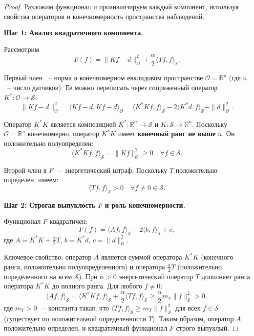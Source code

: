 \documentclass[a4paper,14pt,oneside,openany]{extarticle}
\begin{document}
\begin{proof}
Разложим функционал и проанализируем каждый компонент, используя свойства операторов и 
конечномерность пространства наблюдений.

\textbf{Шаг 1: Анализ квадратичного компонента.}

Рассмотрим
\begin{equation}
    F(f)=\|K f - d\|_{\mathcal{O}}^2 + \frac{\alpha}{2}\langle T f, f\rangle_{\mathcal{S}}.
\end{equation}

Первый член ~-- норма в конечномерном евклидовом пространстве $\mathcal{O} = \mathbb{R}^n$
(где $n$ ~-- число датчиков). 
Ее можно переписать через сопряженный оператор $K^*:\mathcal{O}\to\mathcal{S}$:
\begin{equation}
    \|Kf-d\|_{\mathcal{O}}^2 = \langle Kf-d, Kf-d\rangle_{\mathcal{O}} = 
    \langle K^*Kf, f\rangle_{\mathcal{S}} - 2\langle K^*d, f\rangle_{\mathcal{S}} + \|d\|_{\mathcal{O}}^2.
\end{equation}

Оператор $K^*K$ является композицией $K^*:\mathbb{R}^n\to\mathcal{S}$ и 
$K:\mathcal{S}\to\mathbb{R}^n$. Поскольку $\mathcal{O}=\mathbb{R}^n$
конечномерно, оператор $K^*K$ имеет \textbf{конечный ранг не выше} $n$. 
Он положительно полуопределен:
\begin{equation}
    \langle K^*K f, f\rangle_{\mathcal{S}} = \|Kf\|_{\mathcal{O}}^2 \geq 0 \quad \forall f \in \mathcal{S}.
\end{equation}

Второй член в $F$ ~-- энергетический штраф. Поскольку $T$ положительно определен, имеем:
\begin{equation}
    \langle T f, f\rangle_{\mathcal{S}} > 0 \quad \forall f \neq 0 \in \mathcal{S}.
\end{equation}

\textbf{Шаг 2: Строгая выпуклость $F$ и роль конечномерности.}

Функционал $F$ квадратичен:
\begin{equation}
    F(f) = \langle A f, f\rangle_{\mathcal{S}} - 2\langle b, f\rangle_{\mathcal{S}} + c,
\end{equation}
где $A = K^*K + \frac{\alpha}{2}T$, $b = K^*d$, $c = \|d\|_{\mathcal{O}}^2$.

Ключевое свойство: оператор $A$ является суммой оператора $K^*K$ (конечного ранга, 
положительно полуопределенного) и оператора $\frac{\alpha}{2}T$ 
(положительно определенного на всем $\mathcal{S}$). При $\alpha > 0$ энергетический оператор $T$
дополняет ранга оператора $K^*K$ до полного ранга.
 Для любого $f \neq 0$:
\begin{equation}
    \langle A f, f\rangle_{\mathcal{S}} = \langle K^*K f, f\rangle_{\mathcal{S}} + 
    \frac{\alpha}{2}\langle T f, f\rangle_{\mathcal{S}} \geq \frac{\alpha}{2} m_T \|f\|_{\mathcal{S}}^2 > 0,
\end{equation}
где $m_T > 0$ ~-- константа такая, что $\langle T f, f\rangle_{\mathcal{S}} \geq m_T \|f\|_{\mathcal{S}}^2$
 для всех $f \in \mathcal{S}$ (существует по положительной определенности $T$). 
Таким образом, оператор $A$ положительно определен, и квадратичный функционал $F$ строго выпуклый.


\end{proof}
\end{document}
